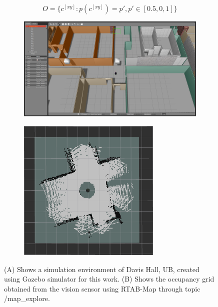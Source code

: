 \begin{equation}
    O = \{c^{[xy]} : p(c^{[xy]}) = p' , p' \in [0.5,0,1]\}
\end{equation}
\begin{figure}
    \begin{subfigure}[b]{\textwidth}
		\centering
		\includegraphics[width=\textwidth]{images/gazebo.png}
		\label{subfig:a}
		\caption{}
		\vspace{2em}
	\end{subfigure}
	\begin{subfigure}[b]{\textwidth}
	    \centering
		\includegraphics[width=0.75\textwidth]{images/gazebo1.png}
		\label{subfig:b}
		\caption{}
	\end{subfigure}
\caption{(A) Shows a simulation environment of Davis Hall, UB, created using Gazebo simulator for this work. (B) Shows the occupancy grid obtained from the vision sensor using RTAB-Map through topic /map\_explore.}
\end{figure}

